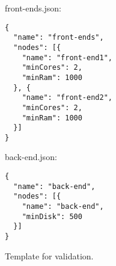 \begin{figure}[tb]
  \begin{center}
    front-ends.json:
    \begin{verbatim}
{
  "name": "front-ends",
  "nodes": [{   
    "name": "front-end1",
    "minCores": 2,
    "minRam": 1000
  }, {   
    "name": "front-end2",
    "minCores": 2,
    "minRam": 1000
  }]
}
    \end{verbatim}
    back-end.json:
    \begin{verbatim}
{
  "name": "back-end",
  "nodes": [{   
    "name": "back-end",
    "minDisk": 500
  }]
}
    \end{verbatim}
  \end{center}
  \caption{Template for validation.}
  \label{list:validation-threenodes}
\end{figure}

